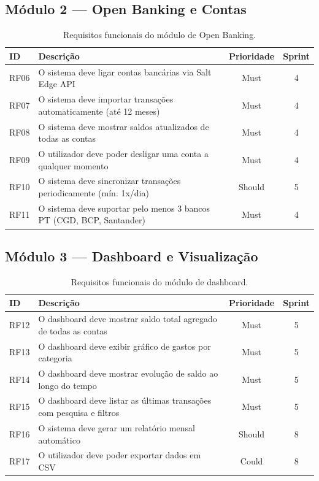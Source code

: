 \subsection{Módulo 2 --- Open Banking e Contas}

\begin{table}[H]
\centering
\caption{Requisitos funcionais do módulo de Open Banking.}
\label{tab:rf-openbanking}
\small
\begin{tabularx}{\textwidth}{l X c c}
\toprule
\textbf{ID} & \textbf{Descrição} & \textbf{Prioridade} & \textbf{Sprint} \\
\midrule
RF06 & O sistema deve ligar contas bancárias via Salt Edge \ac{API} & Must & 4 \\
RF07 & O sistema deve importar transações automaticamente (até 12 meses) & Must & 4 \\
RF08 & O sistema deve mostrar saldos atualizados de todas as contas & Must & 4 \\
RF09 & O utilizador deve poder desligar uma conta a qualquer momento & Must & 4 \\
RF10 & O sistema deve sincronizar transações periodicamente (mín. 1x/dia) & Should & 5 \\
RF11 & O sistema deve suportar pelo menos 3 bancos PT (CGD, BCP, Santander) & Must & 4 \\
\bottomrule
\end{tabularx}
\end{table}

\subsection{Módulo 3 --- Dashboard e Visualização}

\begin{table}[H]
\centering
\caption{Requisitos funcionais do módulo de dashboard.}
\label{tab:rf-dashboard}
\small
\begin{tabularx}{\textwidth}{l X c c}
\toprule
\textbf{ID} & \textbf{Descrição} & \textbf{Prioridade} & \textbf{Sprint} \\
\midrule
RF12 & O dashboard deve mostrar saldo total agregado de todas as contas & Must & 5 \\
RF13 & O dashboard deve exibir gráfico de gastos por categoria & Must & 5 \\
RF14 & O dashboard deve mostrar evolução de saldo ao longo do tempo & Must & 5 \\
RF15 & O dashboard deve listar as últimas transações com pesquisa e filtros & Must & 5 \\
RF16 & O sistema deve gerar um relatório mensal automático & Should & 8 \\
RF17 & O utilizador deve poder exportar dados em CSV & Could & 8 \\
\bottomrule
\end{tabularx}
\end{table}

